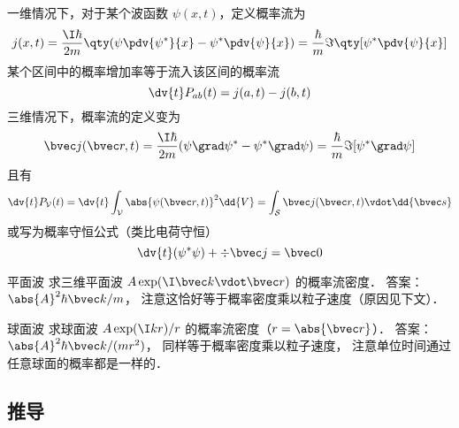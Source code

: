 

一维情况下，对于某个波函数 $\psi(x,t)$，定义概率流为
\begin{equation}
j(x,t) = \frac{\I\hbar}{2m} \qty(\psi \pdv{\psi^*}{x} - \psi^* \pdv{\psi}{x})
= \frac{\hbar}{m} \Im\qty[\psi^* \pdv{\psi}{x}]
\end{equation}
某个区间中的概率增加率等于流入该区间的概率流
\begin{equation}
\dv{t} P_{ab}(t) = j(a,t) - j(b,t)
\end{equation}
三维情况下，概率流的定义变为
\begin{equation}
\bvec j(\bvec r,t) = \frac{\I\hbar }{2m} (\psi \grad \psi^* - \psi ^* \grad \psi)
= \frac{\hbar}{m} \Im[\psi^* \grad\psi]
\end{equation}
且有
\begin{equation}
\dv{t} P_\mathcal{V}(t) = \dv{t} \int_\mathcal{V} \abs{\psi (\bvec r,t)}^2 \dd{V}
= \int_\mathcal{S} \bvec j(\bvec r,t) \vdot \dd{\bvec s}
\end{equation}
或写为概率守恒公式（类比电荷守恒）
\begin{equation}
\dv{t} (\psi^* \psi) + \div\bvec j = \bvec 0
\end{equation}

\begin{exercise}{平面波}
求三维平面波 $A \exp(\I \bvec k \vdot \bvec r)$ 的概率流密度． 答案： $\abs{A}^2 \hbar\bvec k/m$， 注意这恰好等于概率密度乘以粒子速度（原因见下文）．
\end{exercise}

\begin{exercise}{球面波}
求球面波 $A \exp(\I k r)/r$ 的概率流密度（$r = \abs{\bvec r}$）． 答案： $\abs{A}^2 \hbar\bvec k/(mr^2)$， 同样等于概率密度乘以粒子速度， 注意单位时间通过任意球面的概率都是一样的．
\end{exercise}

\subsection{推导}

